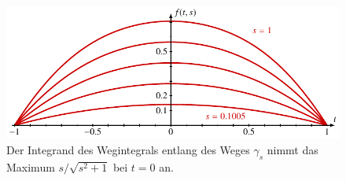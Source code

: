 %
%
%
\begin{figure}
\centering
\includegraphics{chapters/030-kurvenintegral/images/integrand.pdf}
\caption{Der Integrand des Wegintegrals entlang des Weges $\gamma_s$ nimmt
das Maximum $s/\sqrt{s^2+1}$ bei $t=0$ an.
\label{buch:kurvenintegral:differential:fig:integrand}}
\end{figure}
